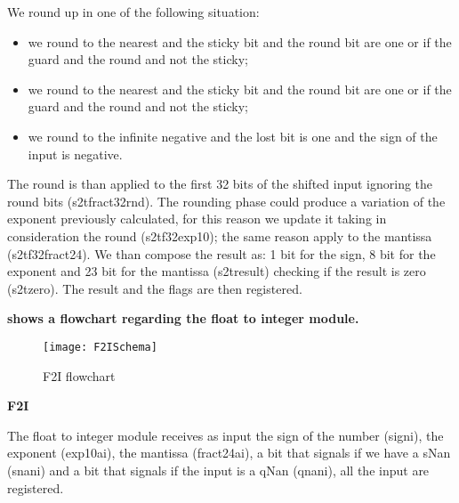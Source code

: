 We round up in one of the following situation:
\begin{itemize}
 \item we round to the nearest and the sticky bit and the round bit are one or if the guard and the round and not the sticky;
 \item we round to the nearest and the sticky bit and the round bit are one or if the guard and the round and not the sticky;
 \item we round to the infinite negative and the lost bit is one and the sign of the input is negative.
\end{itemize}
The round is than applied to the first 32 bits of the shifted input ignoring the round bits (s2t\textunderscore fract32\textunderscore rnd).
The rounding phase could produce a variation of the exponent previously calculated, for this reason we update it taking in consideration the round (s2t\textunderscore f32\textunderscore exp10); the same reason apply to the mantissa (s2t\textunderscore f32\textunderscore fract24).
We than compose the result as: 1 bit for the sign, 8 bit for the exponent and 23 bit for the mantissa (s2t\textunderscore result) checking if the result is zero (s2t\textunderscore zero).
The result and the flags are then registered.
\newline

\textbf{
 shows a flowchart regarding the float to integer module.}
\newline

\begin{figure}
\centering\texttt{[image: F2ISchema]}
\caption{F2I flowchart}	
\label{fig:f2i_schema}
\end{figure}

\textbf{F2I}
\newline

The float to integer module receives as input the sign of the number (sign\textunderscore i), the exponent (exp10a\textunderscore i), the mantissa (fract24a\textunderscore i), a bit that signals if we have a sNan (snan\textunderscore i) and a bit that signals if the input is a qNan (qnan\textunderscore i), all the input are registered.

